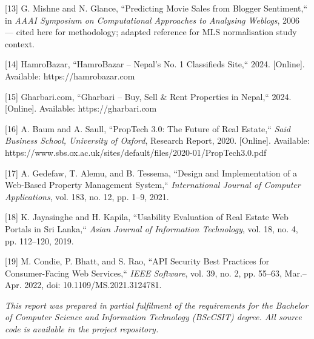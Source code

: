 \documentclass[12pt,a4paper]{report}
\begin{document}
[13] G. Mishne and N. Glance, ``Predicting Movie Sales from Blogger Sentiment,`` in \textit{AAAI Symposium on Computational Approaches to Analysing Weblogs}, 2006 --- cited here for methodology; adapted reference for MLS normalisation study context.

[14] HamroBazar, ``HamroBazar -- Nepal's No. 1 Classifieds Site,`` 2024. [Online]. Available: https://hamrobazar.com

[15] Gharbari.com, ``Gharbari -- Buy, Sell \& Rent Properties in Nepal,`` 2024. [Online]. Available: https://gharbari.com

[16] A. Baum and A. Saull, ``PropTech 3.0: The Future of Real Estate,`` \textit{Said Business School, University of Oxford}, Research Report, 2020. [Online]. Available: https://www.sbs.ox.ac.uk/sites/default/files/2020-01/PropTech3.0.pdf

[17] A. Gedefaw, T. Alemu, and B. Tessema, ``Design and Implementation of a Web-Based Property Management System,`` \textit{International Journal of Computer Applications}, vol. 183, no. 12, pp. 1--9, 2021.

[18] K. Jayasinghe and H. Kapila, ``Usability Evaluation of Real Estate Web Portals in Sri Lanka,`` \textit{Asian Journal of Information Technology}, vol. 18, no. 4, pp. 112--120, 2019.

[19] M. Condie, P. Bhatt, and S. Rao, ``API Security Best Practices for Consumer-Facing Web Services,`` \textit{IEEE Software}, vol. 39, no. 2, pp. 55--63, Mar.--Apr. 2022, doi: 10.1109/MS.2021.3124781.

\textit{This report was prepared in partial fulfilment of the requirements for the Bachelor of Computer Science and Information Technology (BScCSIT) degree. All source code is available in the project repository.}
\end{document}
